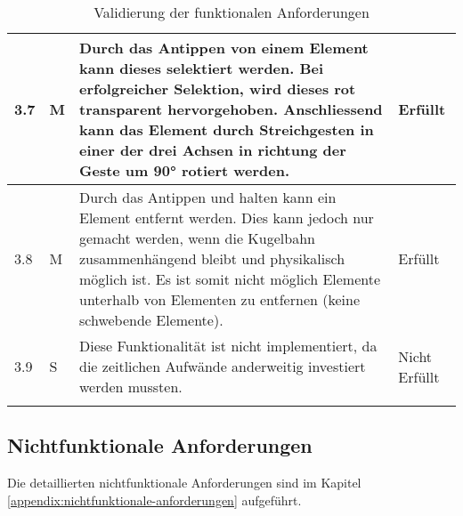 \begin{longtable}{l l p{10cm} l}
	\hline
	3.7 & M & Durch das Antippen von einem Element kann dieses selektiert werden. Bei erfolgreicher Selektion, wird dieses rot transparent hervorgehoben. Anschliessend kann das Element durch Streichgesten in einer der drei Achsen in richtung der Geste um 90° rotiert werden. & Erfüllt \\
	\hline
	3.8 & M & Durch das Antippen und halten kann ein Element entfernt werden. Dies kann jedoch nur gemacht werden, wenn die Kugelbahn zusammenhängend bleibt und physikalisch möglich ist. Es ist somit nicht möglich Elemente unterhalb von Elementen zu entfernen (keine schwebende Elemente). & Erfüllt \\
	\hline
	3.9 & S & Diese Funktionalität ist nicht implementiert, da die zeitlichen Aufwände anderweitig investiert werden mussten. & Nicht Erfüllt \\
	\hline
	\caption{Validierung der funktionalen Anforderungen}
\end{longtable}


\subsection{Nichtfunktionale Anforderungen}


Die detaillierten nichtfunktionale Anforderungen sind im Kapitel \ref{appendix:nichtfunktionale-anforderungen} aufgeführt.

